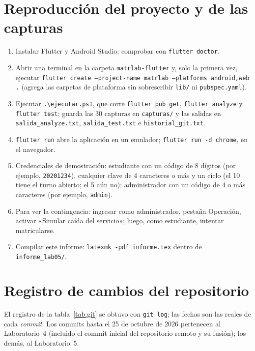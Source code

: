\appendix
\section{Reproducción del proyecto y de las capturas}
\label{anx:repro}
\begin{enumerate}
	\item Instalar Flutter y Android Studio; comprobar con \texttt{flutter doctor}.
	\item Abrir una terminal en la carpeta \texttt{matrlab-flutter} y, solo la primera vez, ejecutar \texttt{flutter create --project-name matrlab --platforms android,web .} (agrega las carpetas de plataforma sin sobrescribir \texttt{lib/} ni \texttt{pubspec.yaml}).
	\item Ejecutar \texttt{.\textbackslash ejecutar.ps1}, que corre \texttt{flutter pub get}, \texttt{flutter analyze} y \texttt{flutter test}; guarda las 30 capturas en \texttt{capturas/} y las salidas en \texttt{salida\_analyze.txt}, \texttt{salida\_test.txt} e \texttt{historial\_git.txt}.
	\item \texttt{flutter run} abre la aplicación en un emulador; \texttt{flutter run -d chrome}, en el navegador.
	\item Credenciales de demostración: estudiante con un código de 8 dígitos (por ejemplo, \texttt{20201234}), cualquier clave de 4 caracteres o más y un ciclo (el 10 tiene el turno abierto; el 5 aún no); administrador con un código de 4 o más caracteres (por ejemplo, \texttt{admin}).
	\item Para ver la contingencia: ingresar como administrador, pestaña Operación, activar «Simular caída del servicio»; luego, como estudiante, intentar matricularse.
	\item Compilar este informe: \texttt{latexmk -pdf informe.tex} dentro de \texttt{informe\_lab05/}.
\end{enumerate}

\section{Registro de cambios del repositorio}
\label{anx:git}
El registro de la tabla~\ref{tab:git} se obtuvo con \texttt{git log}; las fechas son las reales de cada \emph{commit}. Los commits hasta el 25 de octubre de 2026 pertenecen al Laboratorio~4 (incluido el commit inicial del repositorio remoto y su fusión); los demás, al Laboratorio~5.
